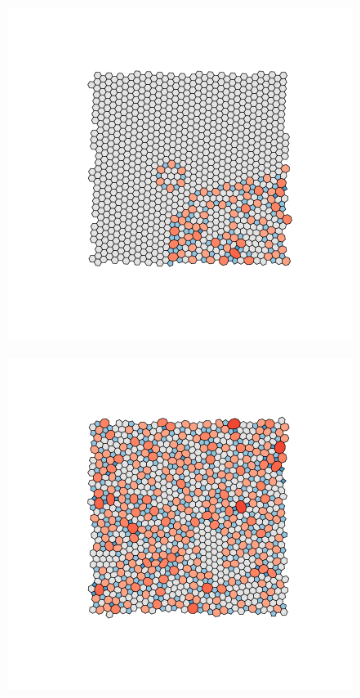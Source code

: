 \begin{figure}[h!]
     \centering
     
     \begin{subfigure}[b]{0.35\textwidth}
         \centering
         \includegraphics[width=\textwidth]{./figures/bilayers/mx2_sq_1.pdf}
         \caption{}
         \label{fig:triraft1}
     \end{subfigure}
     \hspace{1cm}
     \begin{subfigure}[b]{0.35\textwidth}
         \centering
         \includegraphics[width=\textwidth]{./figures/bilayers/mx2_sq_2.pdf}
         \caption{}
         \label{fig:triraft2}
     \end{subfigure}
     \hfill
     

\end{figure}
